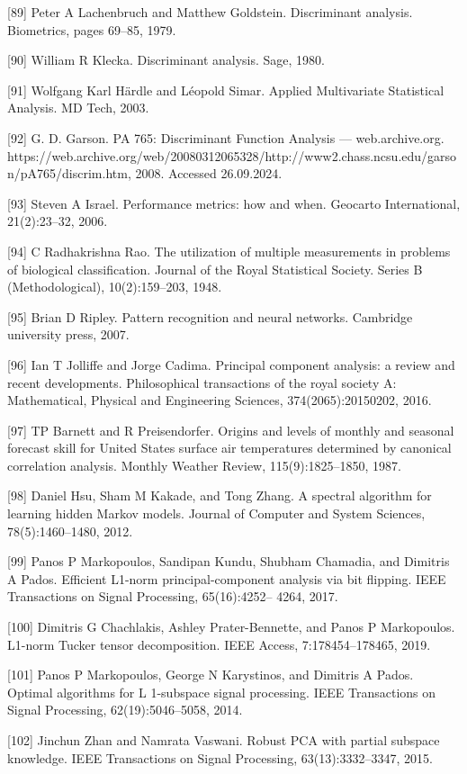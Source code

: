\documentclass[preprint,12pt]{elsarticle}
\begin{document}
[89] Peter A Lachenbruch and Matthew Goldstein. Discriminant analysis. Biometrics, pages 69–85, 1979. 

[90] William R Klecka. Discriminant analysis. Sage, 1980. 

[91] Wolfgang Karl Härdle and Léopold Simar. Applied Multivariate Statistical Analysis. MD Tech, 2003. 

[92] G. D. Garson. PA 765: Discriminant Function Analysis — web.archive.org. https://web.archive.org/web/20080312065328/http://www2.chass.ncsu.edu/garson/pA765/discrim.htm, 2008. Accessed 26.09.2024. 

[93] Steven A Israel. Performance metrics: how and when. Geocarto International, 21(2):23–32, 2006. 

[94] C Radhakrishna Rao. The utilization of multiple measurements in problems of biological classification. Journal of the Royal Statistical Society. Series B (Methodological), 10(2):159–203, 1948. 

[95] Brian D Ripley. Pattern recognition and neural networks. Cambridge university press, 2007. 

[96] Ian T Jolliffe and Jorge Cadima. Principal component analysis: a review and recent developments. Philosophical transactions of the royal society A: Mathematical, Physical and Engineering Sciences, 374(2065):20150202, 2016. 

[97] TP Barnett and R Preisendorfer. Origins and levels of monthly and seasonal forecast skill for United States surface air temperatures determined by canonical correlation analysis. Monthly Weather Review, 115(9):1825–1850, 1987. 

[98] Daniel Hsu, Sham M Kakade, and Tong Zhang. A spectral algorithm for learning hidden Markov models. Journal of Computer and System Sciences, 78(5):1460–1480, 2012. 

[99] Panos P Markopoulos, Sandipan Kundu, Shubham Chamadia, and Dimitris A Pados. Efficient L1-norm principal-component analysis via bit flipping. IEEE Transactions on Signal Processing, 65(16):4252– 4264, 2017. 

[100] Dimitris G Chachlakis, Ashley Prater-Bennette, and Panos P Markopoulos. L1-norm Tucker tensor decomposition. IEEE Access, 7:178454–178465, 2019. 

[101] Panos P Markopoulos, George N Karystinos, and Dimitris A Pados. Optimal algorithms for L {1}-subspace signal processing. IEEE Transactions on Signal Processing, 62(19):5046–5058, 2014. 

[102] Jinchun Zhan and Namrata Vaswani. Robust PCA with partial subspace knowledge. IEEE Transactions on Signal Processing, 63(13):3332–3347, 2015. 
\end{document}
